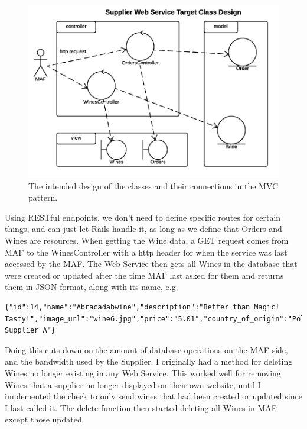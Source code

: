 \documentclass[12pt]{article}
\begin{document}
\begin{figure}[H]
        \centering
                \includegraphics[width=1\textwidth]{assets/Supplier_Web_Service_Target_Class_Design}
                \caption{The intended design of the classes and their connections in the MVC pattern.}
                \label{fig: Target Class Diagram.} 
\end{figure}

Using RESTful endpoints, we don't need to define specific routes for certain things, and can just let Rails handle it, as long as we define that Orders and Wines are resources. When getting the Wine data, a GET request comes from MAF to the WinesController with a http header for when the service was last accessed by the MAF. The Web Service then gets all Wines in the database that were created or updated after the time MAF last asked for them and returns them in JSON format, along with its name, e.g.
\begin{lstlisting}
{"id":14,"name":"Abracadabwine","description":"Better than Magic! Tasty!","image_url":"wine6.jpg","price":"5.01","country_of_origin":"Poland","grape_type":"Green","suitable_for_vegetarians":true,"bottle_size":"350ml","url":"http://localhost:3001/wines/14.json","supplier":"Wine Supplier A"}
\end{lstlisting}

Doing this cuts down on the amount of database operations on the MAF side, and the bandwidth used by the Supplier. I originally had a method for deleting Wines no longer existing in any Web Service. This worked well for removing Wines that a supplier no longer displayed on their own website, until I implemented the check to only send wines that had been created or updated since I last called it. The delete function then started deleting all Wines in MAF except those updated.
\end{document}
